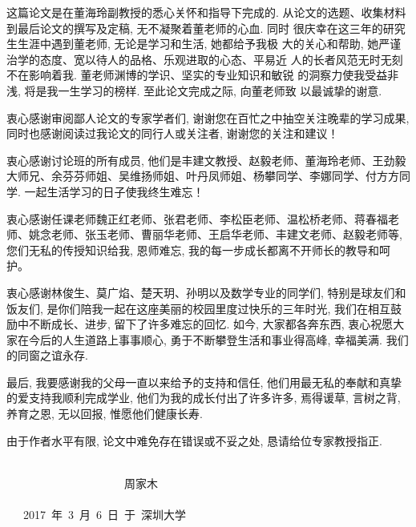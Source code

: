 ﻿
\begin{thanks}

这篇论文是在董海玲副教授的悉心关怀和指导下完成的. 从论文的选题、收集材料到最后论文的撰写及定稿, 无不凝聚着董老师的心血. 同时
很庆幸在这三年的研究生生涯中遇到董老师, 无论是学习和生活, 她都给予我极
大的关心和帮助, 她严谨治学的态度、宽以待人的品格、乐观进取的心态、平易近
人的长者风范无时无刻不在影响着我. 董老师渊博的学识、坚实的专业知识和敏锐
的洞察力使我受益非浅, 将是我一生学习的榜样. 至此论文完成之际, 向董老师致
以最诚挚的谢意.

衷心感谢审阅鄙人论文的专家学者们, 谢谢您在百忙之中抽空关注晚辈的学习成果, 同时也感谢阅读过我论文的同行人或关注者, 谢谢您的关注和建议！

衷心感谢讨论班的所有成员, 他们是丰建文教授、赵毅老师、董海玲老师、王劲毅大师兄、余芬芬师姐、吴维扬师姐、叶丹凤师姐、杨攀同学、李娜同学、付方方同学.
一起生活学习的日子使我终生难忘！

衷心感谢任课老师魏正红老师、张君老师、李松臣老师、温松桥老师、蒋春福老师、姚念老师、张玉老师、曹丽华老师、王启华老师、丰建文老师、赵毅老师等, 您们无私的传授知识给我, 恩师难忘, 我的每一步成长都离不开师长的教导和呵护。

衷心感谢林俊生、莫广焰、楚天玥、孙明以及数学专业的同学们, 特别是球友们和饭友们, 是你们陪我一起在这座美丽的校园里度过快乐的三年时光, 我们在相互鼓励中不断成长、进步, 留下了许多难忘的回忆. 如今, 大家都各奔东西, 衷心祝愿大家在今后的人生道路上事事顺心, 勇于不断攀登生活和事业得高峰, 幸福美满. 我们的同窗之谊永存.




最后, 我要感谢我的父母一直以来给予的支持和信任, 他们用最无私的奉献和真挚的爱支持我顺利完成学业, 他们为我的成长付出了许多许多, 焉得谖草, 言树之背, 养育之恩, 无以回报, 惟愿他们健康长寿.

由于作者水平有限, 论文中难免存在错误或不妥之处, 恳请给位专家教授指正.

\vskip 18pt
~~~~~~~~~~~~~~~~~~~~~~~~~~~~~~~~~~~~~~~~~~~~~~~~~~~~~~~~~~~~~~~~~~~~~~~~~~~~~~~~~~~~~~~~~~~~~周家木
\vskip 10pt
~~~~~~~~~~~~~~~~~~~~~~~~~~~~~~~~~~~~~~~~~~~~~~~~~~~~~~~~~~~~~~~~~~~~~~~~~~~2017~年~3~月~6~日~于~深圳大学

\end{thanks}
